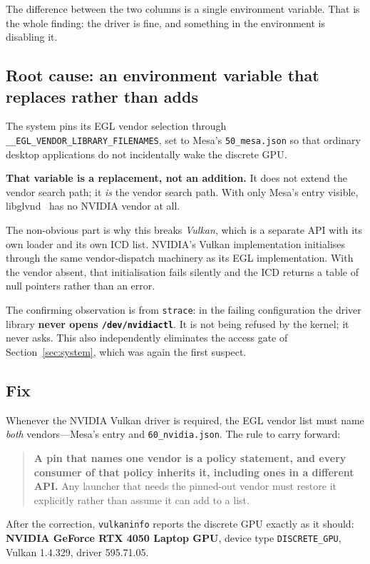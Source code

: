 The difference between the two columns is a single environment variable. That is
the whole finding: the driver is fine, and something in the environment is
disabling it.

\subsection{Root cause: an environment variable that replaces rather than adds}

The system pins its EGL vendor selection through
\verb|__EGL_VENDOR_LIBRARY_FILENAMES|, set to Mesa's \verb|50_mesa.json| so that
ordinary desktop applications do not incidentally wake the discrete GPU.

\textbf{That variable is a replacement, not an addition.} It does not extend the
vendor search path; it \emph{is} the vendor search path. With only Mesa's entry
visible, libglvnd~\cite{glvnd} has no NVIDIA vendor at all.

The non-obvious part is why this breaks \emph{Vulkan}, which is a separate API
with its own loader and its own ICD list. NVIDIA's Vulkan implementation
initialises through the same vendor-dispatch machinery as its EGL
implementation. With the vendor absent, that initialisation fails silently and
the ICD returns a table of null pointers rather than an error.

The confirming observation is from \verb|strace|: in the failing configuration
the driver library \textbf{never opens \texttt{/dev/nvidiactl}}. It is not being
refused by the kernel; it never asks. This also independently eliminates the
access gate of Section~\ref{sec:system}, which was again the first suspect.

\subsection{Fix}

Whenever the NVIDIA Vulkan driver is required, the EGL vendor list must name
\emph{both} vendors---Mesa's entry and \verb|60_nvidia.json|. The rule to carry
forward:

\begin{quote}
\textbf{A pin that names one vendor is a policy statement, and every consumer of
that policy inherits it, including ones in a different API.} Any launcher that
needs the pinned-out vendor must restore it explicitly rather than assume it can
add to a list.
\end{quote}

After the correction, \verb|vulkaninfo| reports the discrete GPU exactly as it
should: \textbf{NVIDIA GeForce RTX 4050 Laptop GPU}, device type
\verb|DISCRETE_GPU|, Vulkan 1.4.329, driver 595.71.05.

